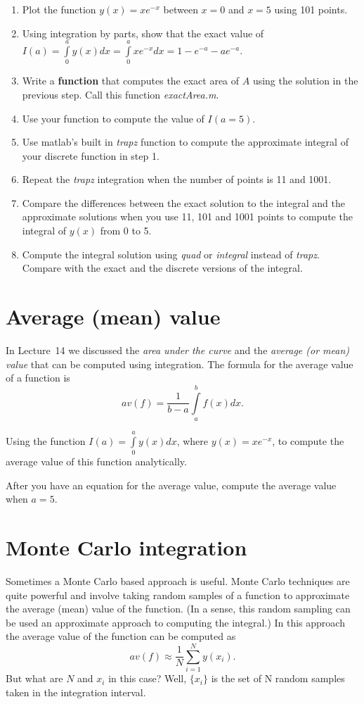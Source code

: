 \documentclass[10pt,fleqn]{article}
\begin{document}
\begin{enumerate}
	\item Plot the function $y(x)=xe^{-x}$ between $x=0$ and $x=5$ using 101 points.
	\item Using integration by parts, show that the exact value of $I(a) = \int\limits_0^a y(x) dx = \int \limits_0^a xe^{-x} dx = 1-e^{-a} - ae^{-a}$.
	\item Write a \textbf{function} that computes the exact area of $A$ using the solution in the previous step. Call this function \textit{exactArea.m}.
	\item Use your function to compute the value of $I(a=5)$.
	\item Use matlab's built in \textit{trapz} function to compute the approximate integral of your discrete function in step 1.
	\item Repeat the \textit{trapz} integration when the number of points is 11 and 1001. 
	\item Compare the differences between the exact solution to the integral and the approximate solutions when you use 11, 101 and 1001 points to compute the integral of $y(x)$ from 0 to 5.
	\item Compute the integral solution using \textit{quad} or \textit{integral} instead of \textit{trapz}. Compare with the exact and the discrete versions of the integral.
\end{enumerate}

\section*{Average (mean) value}

In Lecture~14 we discussed the \textit{area under the curve} and the \textit{average (or mean) value} that can be computed using integration. The formula for the average value of a function is $$av(f) = \frac{1}{b-a} \int \limits_a^b f(x) dx.$$

Using the function $I(a) = \int\limits_0^a y(x) dx$, where $y(x)=xe^{-x}$, to compute the average value of this function analytically.

After you have an equation for the average value, compute the average value when $a=5$.

\section*{Monte Carlo integration}

Sometimes a Monte Carlo based approach is useful. Monte Carlo techniques are quite powerful and involve taking random samples of a function to approximate the average (mean) value of the function. (In a sense, this random sampling can be used an approximate approach to computing the integral.) In this approach the average value of the function can be computed as $$ av(f) \approx \frac{1}{N} \sum\limits_{i=1}^N y(x_i).$$
But what are $N$ and $x_i$ in this case? Well, $ \{ x_i \}$ is the set of N random samples taken in the integration interval.
\end{document}
